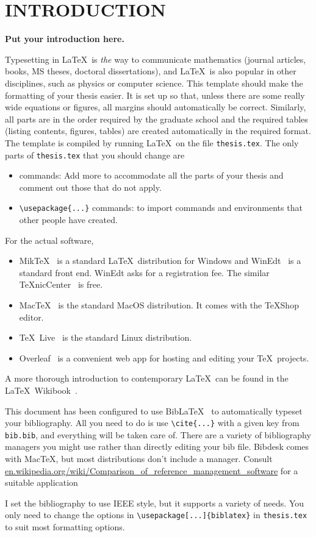 
\chapter{INTRODUCTION}\label{chap1:introduction}

{\bf Put your introduction here.}


Typesetting in \LaTeX \ is {\em the} way to communicate mathematics
(journal articles, books, MS theses, doctoral dissertations),
and \LaTeX \ is also popular in other disciplines, such as 
physics or computer science. This template should make the formatting
of your thesis easier. It is set up so that, unless there are some really
wide equations or figures, all margins should automatically be correct.
Similarly, all parts are in the order required by the graduate school and 
the required tables (listing contents, figures, tables)
are created automatically in the required format. 
The template is compiled by running \LaTeX \ on 
the file \verb+thesis.tex+. The only parts of 
\verb+thesis.tex+ that you should change are
\begin{itemize}
	\item \verb++ commands: Add more to accommodate all the
	parts of your thesis and comment out those that do not apply. 
	\item \verb+\usepackage{...}+ commands: to import commands
	and environments that other people have created.
\end{itemize}

\newpage
For the actual software,
\begin{itemize}
	\item Mik\TeX~\cite{MiKTeX}
	is a standard \LaTeX\ distribution for Windows and
	WinEdt~\cite{WinEdt} is a standard front end.
	WinEdt asks for a registration fee. 
	The similar \TeX nicCenter~\cite{TeXnicCenter}
	is free. 
	\item Mac\TeX~\cite{MacTeX} is the standard MacOS distribution.
	It comes with the \TeX Shop editor.
	\item \TeX\ Live~\cite{TeXLive} is the standard Linux distribution.
	\item Overleaf~\cite{overleaf} is a convenient web app for hosting and 
	editing your \TeX\ projects.
\end{itemize}
A more thorough introduction to contemporary \LaTeX\ can be
found in the \LaTeX\ Wikibook~\cite{Wikibook}.

This document has been configured to use Bib\LaTeX~\cite{biblatex} to
automatically typeset your bibliography. All you need to do is use
\verb+\cite{...}+ with a given key from \verb+bib.bib+, and everything
will be taken care of. There are a variety of bibliography managers you might use rather than directly editing your bib file. Bibdesk comes with Mac\TeX, but most distributions don't include a manager. Consult \url{en.wikipedia.org/wiki/Comparison_of_reference_management_software} for a suitable application

I set the bibliography to use IEEE style, but it supports
a variety of needs. You only need to change the options in 
\verb+\usepackage[...]{biblatex}+ in \verb+thesis.tex+ to 
suit most formatting options.